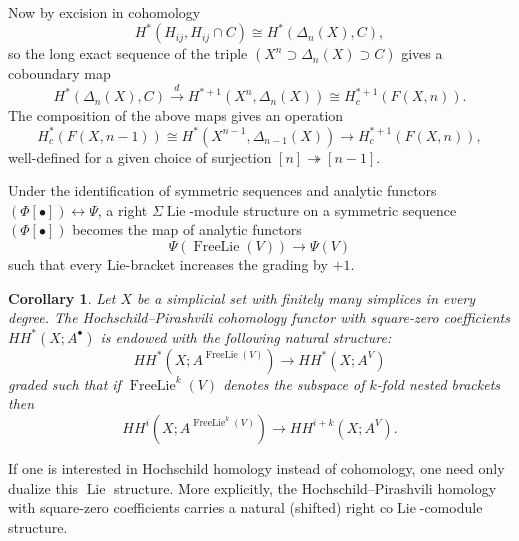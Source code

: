 \documentclass[12pt]{article}
\newcommand{\OperSuspension}{\Sigma}
\DeclareMathOperator{\Lie}{Lie}
\theoremstyle{plain}
\newtheorem{cor}[thm]{Corollary}
\theoremstyle{definition}
\theoremstyle{remark}
\begin{document}
Now by excision in cohomology
\begin{equation}
    H^*(H_{ij}, H_{ij}\cap C) \cong H^*(\Delta_n(X), C), %
\end{equation}
so the long exact sequence of the triple $(X^n\supset \Delta_n(X) \supset C)$ gives a coboundary map
\begin{equation}
    H^*(\Delta_n(X), C) \overset{d}\longrightarrow H^{*+1}(X^n,\Delta_n(X)) \cong H^{*+1}_c(F(X,n)).
\end{equation}
The composition of the above maps gives an operation
\begin{equation}
    H^*_c(F(X,n-1)) \cong H^*(X^{n-1},\Delta_{n-1}(X)) \to H^{*+1}_c(F(X,n)),
\end{equation}
well-defined for a given choice of surjection $[n]\twoheadrightarrow [n-1]$.

Under the identification of symmetric sequences and analytic functors $(\Phi[\bullet])\leftrightarrow \Psi$, a right $\OperSuspension\Lie$-module structure on a symmetric sequence $(\Phi[\bullet])$ becomes the map of analytic functors
\begin{equation}
    \Psi\left( \operatorname{FreeLie}(V) \right) \to \Psi(V)
\end{equation}
such that every Lie-bracket increases the grading by $+1$.

\begin{cor}
Let $X$ be a simplicial set with finitely many simplices in every degree. The Hochschild--Pirashvili cohomology functor with square-zero coefficients $HH^*(X;A^{\bullet})$ is endowed with the following natural structure:
\begin{equation}
HH^*(X;A^{\operatorname{FreeLie}(V)}) \to HH^*(X;A^V)
\end{equation}
graded such that if $\operatorname{FreeLie}^k(V)$ denotes the subspace of $k$-fold nested brackets then
\begin{equation}
    HH^i(X;A^{\operatorname{FreeLie}^k(V)}) \to HH^{i+k}(X;A^V).
\end{equation}
\end{cor}

If one is interested in Hochschild homology instead of cohomology, one need only dualize this $\Lie$ structure. More explicitly, the Hochschild--Pirashvili homology with square-zero coefficients carries a natural (shifted) right co$\Lie$-comodule structure.
\end{document}
